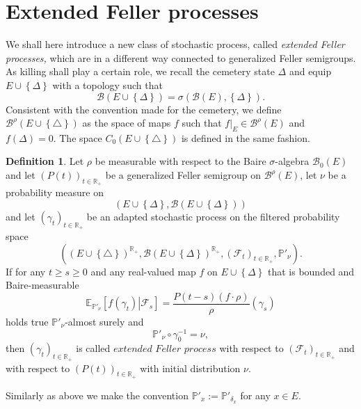 \documentclass[a4paper,12pt]{article}
\theoremstyle{definition}
\newtheorem{definition}[theorem]{Definition}
\theoremstyle{remark}
\numberwithin{equation}{section}
\numberwithin{theorem}{section}
\begin{document}
\section{Extended Feller processes}

We shall here introduce a new class of stochastic process, called \emph{extended Feller processes,} which are in a different way connected to generalized Feller semigroups. As killing shall play a certain role, 
we recall the cemetery  state $\Delta$ and equip $E\cup\left\{ \Delta\right\} $ with a topology such that
\[
\mathcal{B}(E\cup\left\{ \Delta\right\} )=\sigma\left(\mathcal{B}(E),\left\{ \Delta\right\} \right).
\]
Consistent with the convention made for the cemetery, we
define $\mathcal{\mathscr{B}}^{\rho}(E\cup\left\{ \triangle\right\}) $
as the space of maps $f$ such that $\left.f\right|_{E}\in\mathcal{\mathscr{B}}^{\rho}(E)$
and $f(\Delta)=0.$ The space $C_{0}\left(E\cup\left\{ \triangle\right\} \right)$
is defined in the same fashion. 

\begin{definition}
\label{def:extended Feller process} Let $\rho $ be measurable with respect to the Baire $\sigma$-algebra $\mathcal{B}_0(E)$ and let $\left(P(t)\right)_{t\in\mathbb{R}_{+}}$
be a generalized Feller semigroup on $\mathcal{\mathscr{B}}^{\rho}(E)$,
let $\nu$ be a probability measure on 
\[
\left(E\cup\left\{ \Delta\right\} ,\mathcal{B}(E\cup\left\{ \Delta\right\} )\right)
\]
 and let $\left(\gamma_{t}\right)_{t\in\mathbb{R}_{+}}$ be an adapted
stochastic process on the filtered probability space
\[
\left(\left(E\cup\left\{ \triangle\right\} \right)^{\mathbb{R}_{+}},\mathcal{B}(E\cup\left\{ \Delta\right\} )^{\mathbb{R}_{+}},\left(\mathcal{F}_{t}\right)_{t\in\mathbb{R}_{+}},\mathbb{P}'_{\nu}\right).
\]
If for any $t\geq s\geq0$ and any real-valued map $f$ on $E\cup\left\{ \Delta\right\} $
that is bounded and Baire-measurable
\begin{equation}
\mathbb{E}_{\mathbb{P}'_{\nu}}\left[\left.f(\gamma_{t})\right|\mathcal{F}_{s}\right]=\frac{P\left(t-s\right)\left(f\cdot\rho\right)}{\rho}(\gamma_{s})\label{eq:GFS definition conditional expectation-1}
\end{equation}
holds true $\mathbb{P}'_{\nu}$-almost surely and 
\[
\mathbb{P}'_{\nu}\circ\gamma_{0}^{-1}=\nu,
\]
 then $\left(\gamma_{t}\right)_{t\in\mathbb{R}_{+}}$ is called $\mathit{extended}$
$\mathit{Feller}$ $\mathit{process}$ with respect to $\left(\mathcal{F}_{t}\right)_{t\in\mathbb{R}_{+}}$
and with respect to $\left(P(t)\right)_{t\in\mathbb{R}_{+}}$ with
initial distribution $\nu$.

Similarly as above we make the convention $\mathbb{P}'_{x}:=\mathbb{P}'_{\delta_{x}}$ for any
$x\in E$. 

\end{definition}
\end{document}
